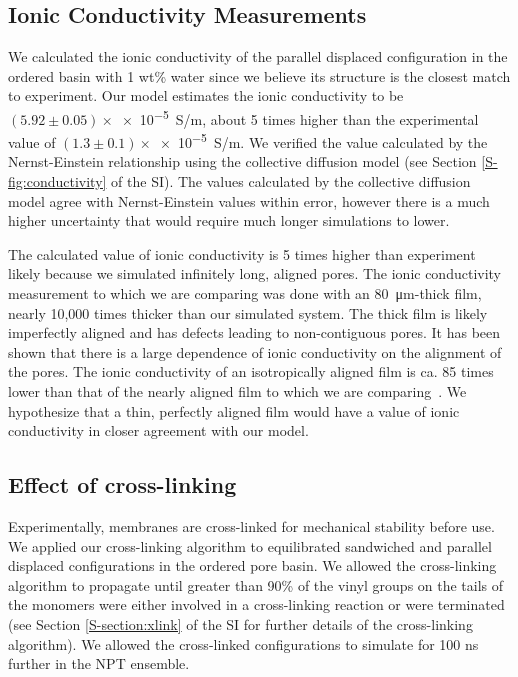 \documentclass[journal=jpcbfk,manuscript=article]{achemso}
\begin{document}
  \subsection{Ionic Conductivity Measurements}
  
  We calculated the ionic conductivity of the parallel displaced configuration in
  the ordered basin with 1 wt\% water since we believe its structure is the 
  closest match to experiment. Our model estimates the ionic conductivity to be
  $(5.92 \pm 0.05)\times$\num{e-5}~S/m, about 5 times higher than the experimental value of 
  $(1.3 \pm 0.1)\times$\num{e-5}~S/m. We verified the value calculated by the Nernst-Einstein
  relationship using the collective diffusion model\cite{liu_collective_2013} 
  (see Section \ref{S-fig:conductivity} of the SI). The values calculated by the 
  collective diffusion model agree with Nernst-Einstein values within error, 
  however there is a much higher uncertainty that would require much longer 
  simulations to lower.

  The calculated value of ionic conductivity is 5 times higher than experiment likely because 
  we simulated infinitely long, aligned pores. The ionic conductivity measurement 
  to which we are comparing was done with an \SI{80}{\micro\metre}-thick film, 
  nearly 10,000 times thicker than our simulated
  system. The thick film is likely imperfectly aligned and has defects leading to
  non-contiguous pores. It has been shown that there is a large dependence of 
  ionic conductivity on the alignment of the pores. The ionic conductivity of an
  isotropically aligned film is ca. 85 times lower than that of the nearly aligned
  film to which we are comparing~\cite{feng_scalable_2014}. We hypothesize that a 
  thin, perfectly aligned film would have a value of ionic conductivity in closer
  agreement with our model.

  \subsection{Effect of cross-linking}\label{section:xlink}

  Experimentally, membranes are cross-linked for mechanical stability before
  use. We applied our cross-linking algorithm to equilibrated sandwiched and
  parallel displaced configurations in the ordered pore basin. We allowed the
  cross-linking algorithm to propagate until greater than 90\% of the vinyl
  groups on the tails of the monomers were either involved in a cross-linking
  reaction or were terminated (see Section \ref{S-section:xlink} of the SI for
  further details of the cross-linking algorithm). We allowed the cross-linked
  configurations to simulate for 100 ns further in the NPT ensemble. 
\end{document}
